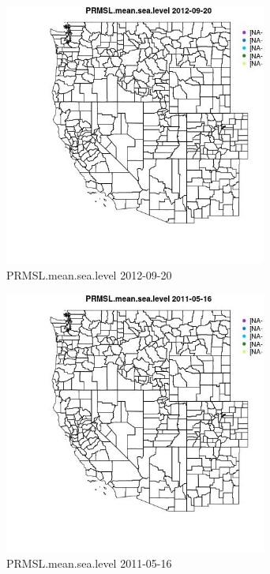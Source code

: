 \begin{figure} 
\centering  
\includegraphics[width=0.77\textwidth]{Code_Outputs/ML_input_report_ML_input_PM25_Step5_part_d_de_duplicated_aves_ML_input_MapObsPRMSLmeansealevel2012-09-20.jpg} 
\caption{\label{fig:ML_input_report_ML_input_PM25_Step5_part_d_de_duplicated_aves_ML_inputMapObsPRMSLmeansealevel2012-09-20}PRMSL.mean.sea.level 2012-09-20} 
\end{figure} 
 

\begin{figure} 
\centering  
\includegraphics[width=0.77\textwidth]{Code_Outputs/ML_input_report_ML_input_PM25_Step5_part_d_de_duplicated_aves_ML_input_MapObsPRMSLmeansealevel2011-05-16.jpg} 
\caption{\label{fig:ML_input_report_ML_input_PM25_Step5_part_d_de_duplicated_aves_ML_inputMapObsPRMSLmeansealevel2011-05-16}PRMSL.mean.sea.level 2011-05-16} 
\end{figure} 
 

